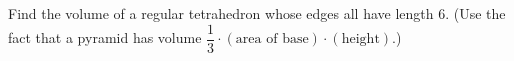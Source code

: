 Find the volume of a regular tetrahedron whose edges all have length $6$. (Use the fact that a pyramid has volume $\dfrac{1}{3}\cdot(\text{area of base})\cdot(\text{height})$.)
